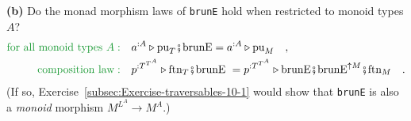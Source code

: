 \textbf{(b)} Do the monad morphism laws of \lstinline!brunE! hold
when restricted to monoid types $A$?
\begin{align*}
{\color{greenunder}\text{for all monoid types }A:}\quad & a^{:A}\triangleright\text{pu}_{T}\bef\text{brunE}=a^{:A}\triangleright\text{pu}_{M}\quad,\\
{\color{greenunder}\text{composition law}:}\quad & p^{:T^{T^{A}}}\triangleright\text{ftn}_{T}\bef\text{brunE }=p^{:T^{T^{A}}}\triangleright\text{brunE}\bef\text{brunE}^{\uparrow M}\bef\text{ftn}_{M}\quad.
\end{align*}
(If so, Exercise~\ref{subsec:Exercise-traversables-10-1} would show
that \lstinline!brunE! is also a \emph{monoid} morphism $M^{L^{A}}\rightarrow M^{A}$.)
\begin{comment}
Failed attempts to verify the composition law:


\end{comment}
